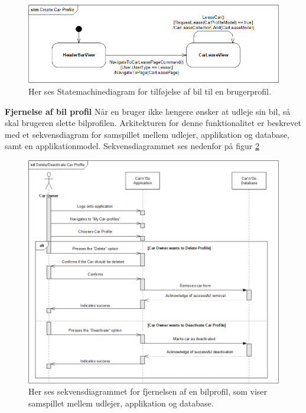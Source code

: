 \documentclass[Arkitektur/System_main.tex]{subfiles}
\begin{document}
\begin{figure}[H]
    \centering
    \includegraphics[width=1\textwidth]{Arkitektur/Softwarearkitektur/Car_registration/graphics/RegisterCarProfileSTM.png}
    \caption{Her ses Statemachinediagram for tilføjelse af bil til en brugerprofil. }
    \label{fig:RegisterCarProfileSTM}
\end{figure}
\textbf{Fjernelse af bil profil}
Når en bruger ikke længere ønsker at udleje sin bil, så skal brugeren slette bilprofilen. Arkitekturen for denne funktionalitet er beskrevet med et sekvensdiagram for samspillet mellem udlejer, applikation og database, samt en applikationmodel. Sekvensdiagrammet ses nedenfor på figur \ref{fig:DeleteCarProfileCD}

\begin{figure}[H]
    \centering
    \includegraphics[width=1\textwidth]{Arkitektur/Softwarearkitektur/Car_registration/graphics/DeleteCarProfileSD.png}
    \caption{Her ses sekvensdiagrammet for fjernelsen af en bilprofil, som viser samspillet mellem udlejer, applikation og database. }
    \label{fig:DeleteCarProfileCD}
\end{figure}
\end{document}
